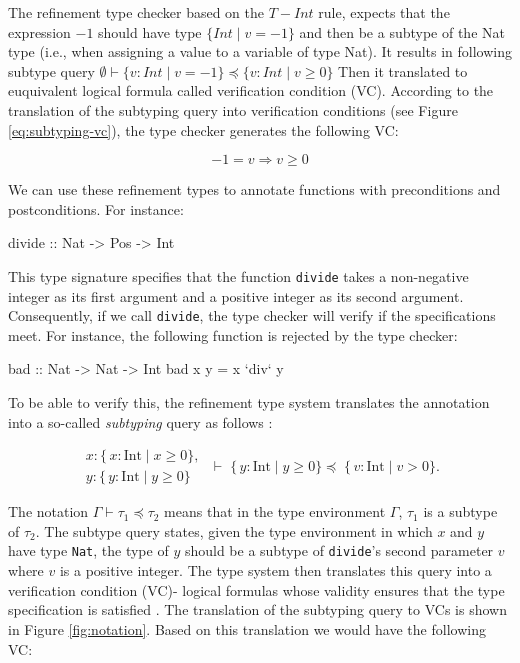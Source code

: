 The refinement type checker based on the \(\mathit{T-Int}\) rule, expects that the expression \(-1\) should have type \(\{Int \mid v = -1\}\)
and then be a subtype of the Nat type (i.e., when assigning a value to a variable of type Nat).
It results in following subtype query $\emptyset \vdash \{v: Int \mid v = -1\} \preceq \{v: Int \mid v \geq 0 \}
$
Then it translated to euquivalent logical formula called verification condition (VC).
According to the translation of the subtyping query into verification conditions (see Figure \ref{eq:subtyping-vc}),
the type checker generates the following VC:

\[
	-1 = v \Rightarrow v \geq 0
\]

We can use these refinement types to annotate functions with
preconditions and postconditions. For instance:
\begin{code}
	divide :: Nat -> Pos -> Int
\end{code}

This type signature specifies that the function \texttt{divide} takes a non-negative
integer as its first argument and a positive integer as its second argument. Consequently, if we call
\texttt{divide}, the type checker will verify if the specifications meet.
For instance, the following function is rejected by the type checker:

\begin{code}
	bad :: Nat -> Nat -> Int
	bad x y = x `div` y
\end{code}
To be able to verify this, the refinement type system translates the annotation into a so-called
\textit{subtyping} query as follows \cite{vazou2014}:

\begin{equation*}
	\label{eq:subtyping}
	\begin{matrix}
		x : \{\,x : \mathrm{Int} \mid x \ge 0\}, \\

		y : \{\,y : \mathrm{Int} \mid y \ge 0\}
	\end{matrix}
	\;\vdash\;
	\{\,y : \mathrm{Int} \mid y \ge 0\}
	\preceq
	\;\{\,v : \mathrm{Int} \mid v > 0\}.
\end{equation*}

The notation $\Gamma  \vdash \tau_1 \preceq \tau_2$ means that in the type environment $\Gamma$,
$\tau_1$ is a subtype of $\tau_2$. The subtype query states, given the type environment in which
$x$ and $y$ have type \texttt{Nat}, the type of $y$ should be a subtype of \texttt{divide}'s second parameter $v$ where $v$ is a positive integer.
The type system then translates this query into a verification condition (VC)- logical formulas whose validity ensures that the type
specification is satisfied \cite{vazou2014}.
The translation of the subtyping query to VCs is shown in Figure \ref{fig:notation}. Based on this
translation we would have the following VC:

